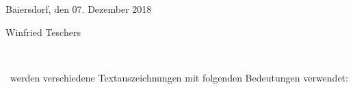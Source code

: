 Baiersdorf, den 07. Dezember 2018

Winfried Teschers

\Endchapter

\newpage

\label                    {cha:Vereinbarungen}
~\vskip 1.6cm
\vskip 0.8cm

\Hier\ werden verschiedene Textauszeichnungen mit folgenden Bedeutungen verwendet:
